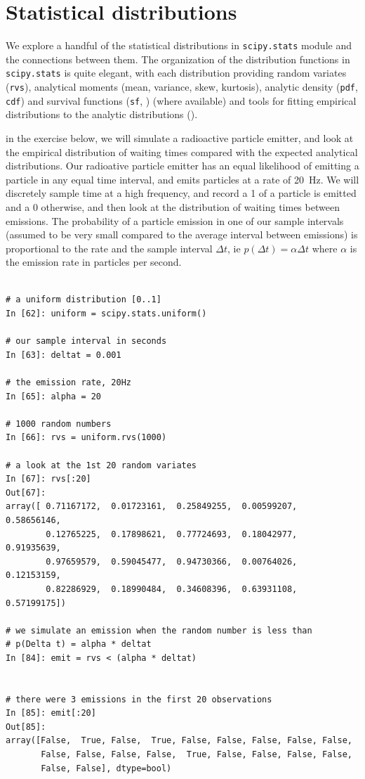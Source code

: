 \section{Statistical distributions}
\label{sec:stats_distributions}

We explore a handful of the statistical distributions in
\texttt{scipy.stats} module and the connections between them.  The
organization of the distribution functions in \texttt{scipy.stats} is
quite elegant, with each distribution providing random variates
(\texttt{rvs}), analytical moments (mean, variance, skew, kurtosis),
analytic density (\texttt{pdf}, \texttt{cdf}) and survival functions
(\texttt{sf}, ) (where available) and tools for fitting
empirical distributions to the analytic distributions ().

in the exercise below, we will simulate a radioactive particle
emitter, and look at the empirical distribution of waiting times
compared with the expected analytical distributions.  Our radioative
particle emitter has an equal likelihood of emitting a particle in any
equal time interval, and emits particles at a rate of 20~Hz.  We will
discretely sample time at a high frequency, and record a 1 of a
particle is emitted and a 0 otherwise, and then look at the
distribution of waiting times between emissions.  The probability of a
particle emission in one of our sample intervals (assumed to be very
small compared to the average interval between emissions) is
proportional to the rate and the sample interval $\Delta t$, ie
$p(\Delta t) = \alpha \Delta t$ where $\alpha$ is the emission rate in
particles per second.

\begin{lstlisting}

# a uniform distribution [0..1]
In [62]: uniform = scipy.stats.uniform()

# our sample interval in seconds
In [63]: deltat = 0.001

# the emission rate, 20Hz
In [65]: alpha = 20

# 1000 random numbers
In [66]: rvs = uniform.rvs(1000)

# a look at the 1st 20 random variates
In [67]: rvs[:20]
Out[67]: 
array([ 0.71167172,  0.01723161,  0.25849255,  0.00599207,  0.58656146,
        0.12765225,  0.17898621,  0.77724693,  0.18042977,  0.91935639,
        0.97659579,  0.59045477,  0.94730366,  0.00764026,  0.12153159,
        0.82286929,  0.18990484,  0.34608396,  0.63931108,  0.57199175])

# we simulate an emission when the random number is less than
# p(Delta t) = alpha * deltat
In [84]: emit = rvs < (alpha * deltat)


# there were 3 emissions in the first 20 observations
In [85]: emit[:20]
Out[85]: 
array([False,  True, False,  True, False, False, False, False, False,
       False, False, False, False,  True, False, False, False, False,
       False, False], dtype=bool)
\end{lstlisting}

